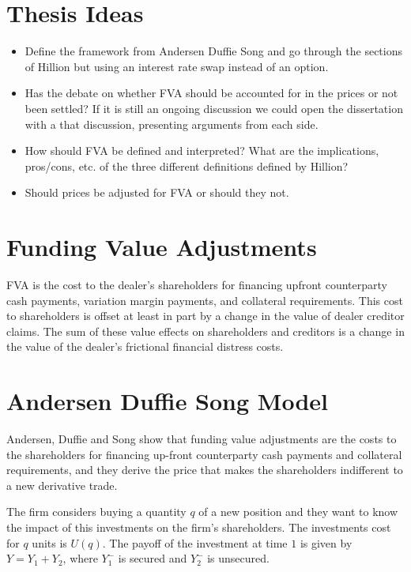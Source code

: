 \documentclass[10pt,a4paper]{article}
\begin{document}
    \section{Thesis Ideas}
        \begin{itemize}
            \item Define the framework from Andersen Duffie Song and go through the sections of Hillion but using an interest rate swap instead of an option.
            \item Has the debate on whether FVA should be accounted for in the prices or not been settled? If it is still an ongoing discussion we could open the dissertation with a that discussion, presenting arguments from each side. 
            \item How should FVA be defined and interpreted? What are the implications, pros/cons, etc. of the three different definitions defined by Hillion?
            \item Should prices be adjusted for FVA or should they not.
        \end{itemize}

    \section{Funding Value Adjustments}
        FVA is the cost to the dealer's shareholders for financing upfront counterparty cash payments, variation margin payments, and collateral requirements. This cost to shareholders is offset at least in part by a change in the value of dealer creditor claims. The sum of these value effects on shareholders and creditors is a change in the value of the dealer's frictional financial distress costs. 

    \section{Andersen Duffie Song Model}

        Andersen, Duffie and Song show that funding value adjustments are the costs to the shareholders for financing up-front counterparty cash payments and collateral requirements, and they derive the price that makes the shareholders indifferent to a new derivative trade.
        
        The firm considers buying a quantity $q$ of a new position and they want to know the impact of this investments on the firm's shareholders. The investments cost for $q$ units is $U(q)$. The payoff of the investment at time $1$ is given by $Y=Y_{1} + Y_{2}$, where $Y_{1}^{-}$ is secured and $Y_{2}^{-}$ is unsecured.
\end{document}
